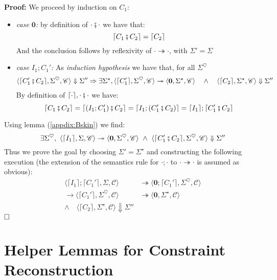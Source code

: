 \documentclass[12pt,a4paper,twoside]{book}
\newcommand{\qed}{\hfill\square}
\newcommand{\heart}{\heartsuit}
\begin{document}
\begin{appendices}
\noindent\textbf{Proof:}
We proceed by induction on $C_1$:
\begin{itemize}
\item \emph{case $\boldsymbol{0}$:} by definition of $\cdot \fatsemi \cdot$ we have that:
$$
\lceil C_1 \fatsemi C_2 \rceil = \lceil C_2 \rceil
$$
And the conclusion follows by reflexivity of $\cdot \twoheadrightarrow \cdot$, with $\Sigma' = \Sigma$
\item \emph{case $I_1; C_1'$:} As \emph{induction hypothesis} we have that, for all $\Sigma^\heart$
\begin{align*}
\begin{split}
\langle \lceil C_1' \fatsemi C_2\rceil, \Sigma^\heart, \mathscr{C}\rangle \Downarrow \Sigma''
\Rightarrow \exists \Sigma^\star,
\langle \lceil C_1' \rceil, \Sigma^\heart, \mathscr{C} \rangle \twoheadrightarrow \langle \boldsymbol{0}, \Sigma^\star, \mathscr{C} \rangle 
\quad\land\quad
\langle \lceil C_2 \rceil, \Sigma^\star, \mathscr{C} \rangle \Downarrow \Sigma''
\end{split}
\end{align*}
By definition of $\lceil \cdot \rceil, \cdot \fatsemi \cdot$ we have:
$$
\lceil C_1 \fatsemi C_2 \rceil = \lceil (I_1; C_1') \fatsemi C_2 \rceil =
\lceil I_1; (C_1' \fatsemi C_2) \rceil = \lceil I_1 \rceil; \lceil C_1' \fatsemi C_2 \rceil
$$
\end{itemize}
Using lemma (\ref{appdix:Bskin}) we find:
$$
\exists \Sigma^\heart,~\langle \lceil I_1 \rceil, \Sigma, \mathscr{C} \rangle \twoheadrightarrow \langle \boldsymbol{0}, \Sigma^\heart, \mathscr{C} \rangle ~\land~ \langle \lceil C_1' \fatsemi C_2 \rceil, \Sigma^\heart, \mathscr{C}\rangle \Downarrow \Sigma''
$$
Thus we prove the goal by choosing $\Sigma' = \Sigma^\star$ and constructing the following execution (the extension of the semantics rule for $\cdot;\cdot$ to $\cdot \twoheadrightarrow \cdot$ is assumed as obvious):
\begin{align*}
\langle \lceil I_1\rceil; \lceil C_1'\rceil, \Sigma, \mathscr{C}\rangle
&\twoheadrightarrow
\langle \boldsymbol{0}; \lceil C_1'\rceil, \Sigma^\heart, \mathscr{C}\rangle\\
\rightarrow \langle \lceil C_1' \rceil, \Sigma^\heart, \mathscr{C}\rangle
&\twoheadrightarrow \langle \boldsymbol{0}, \Sigma^\star, \mathscr{C}\rangle\\
	\land\quad \langle\lceil C_2 \rceil, \Sigma^\star,\mathscr{C}\rangle \Downarrow \Sigma''&
\end{align*}
$\qed$

\chapter{Helper Lemmas for Constraint Reconstruction}

\end{appendices}
\end{document}
